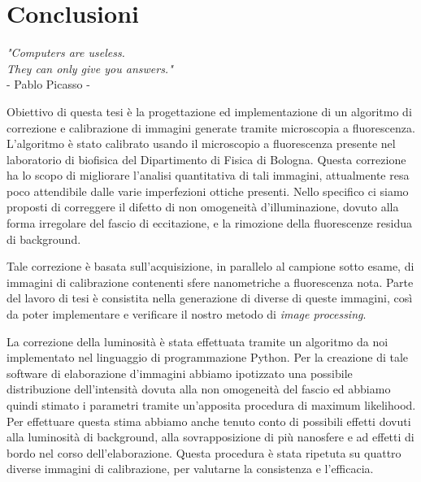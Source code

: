 \clearpage{\pagestyle{empty}\cleardoublepage}

\chapter*{Conclusioni}

\begin{flushright}
\begin{small}\textit{"Computers are useless.\\
 They can only give you answers."}\\
- Pablo Picasso -\\
\end{small}\end{flushright}


Obiettivo di questa tesi è la progettazione ed implementazione di un algoritmo di correzione e calibrazione di immagini generate tramite microscopia a fluorescenza.
L'algoritmo è stato calibrato usando il microscopio a fluorescenza presente nel laboratorio di biofisica del Dipartimento di Fisica di Bologna.
Questa correzione ha lo scopo di migliorare l'analisi quantitativa di tali immagini, attualmente resa poco attendibile dalle varie imperfezioni ottiche presenti.
Nello specifico ci siamo proposti di correggere il difetto di non omogeneità d'illuminazione, dovuto alla forma irregolare del fascio di eccitazione, e la rimozione della fluorescenze residua di background.

Tale correzione è basata sull'acquisizione, in parallelo al campione sotto esame, di immagini di calibrazione contenenti sfere nanometriche a fluorescenza nota.
Parte del lavoro di tesi è consistita nella generazione di diverse di queste immagini, così da poter implementare e verificare il nostro metodo di \textit{image processing}.

La correzione della luminosità è stata effettuata tramite un algoritmo da noi implementato nel linguaggio di programmazione Python.
Per la creazione di tale software di elaborazione d'immagini abbiamo ipotizzato una possibile distribuzione dell'intensità dovuta alla non omogeneità del fascio ed abbiamo quindi stimato i parametri tramite un'apposita procedura di maximum likelihood.
Per effettuare questa stima abbiamo anche tenuto conto di possibili effetti dovuti alla luminosità di background, alla sovrapposizione di più nanosfere e ad effetti di bordo nel corso dell'elaborazione.
Questa procedura è stata ripetuta su quattro diverse immagini di calibrazione, per valutarne la consistenza e l'efficacia.

